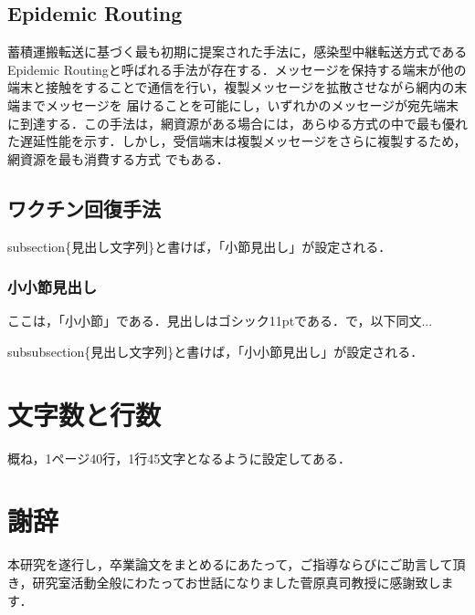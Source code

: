 \documentclass[11pt]{icsthesis}
\begin{document}
\subsection{Epidemic Routing}
蓄積運搬転送に基づく最も初期に提案された手法に，感染型中継転送方式であるEpidemic Routingと呼ばれる手法が存在する．メッセージを保持する端末が他の端末と接触をすることで通信を行い，複製メッセージを拡散させながら網内の末端までメッセージを
届けることを可能にし，いずれかのメッセージが宛先端末に到達する．この手法は，網資源がある場合には，あらゆる方式の中で最も優れた遅延性能を示す．しかし，受信端末は複製メッセージをさらに複製するため，網資源を最も消費する方式
でもある．


\subsection{ワクチン回復手法}

\textsf{\yen subsection\{見出し文字列\}}と書けば，「小節見出し」が設定される．

\subsubsection{小小節見出し}
ここは，「小小節」である．見出しはゴシック11ptである．で，以下同文...

\textsf{\yen subsubsection\{見出し文字列\}}と書けば，「小小節見出し」が設定される．

\section{文字数と行数}
概ね，1ページ40行，1行45文字となるように設定してある．



\clearpage
\fancyhead[L]{}\fancyhead[R]{}
\renewcommand{\headrulewidth}{0truemm}
\section*{謝辞}
本研究を遂行し，卒業論文をまとめるにあたって，ご指導ならびにご助言して頂き，研究室活動全般にわたってお世話になりました菅原真司教授に感謝致します．
\end{document}
